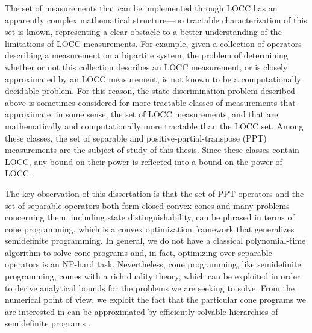 The set of measurements that can be implemented through LOCC has an apparently
complex mathematical structure---no tractable characterization of this set is
known, representing a clear obstacle to a better understanding of the
limitations of LOCC measurements.
For example, given a collection of operators 
describing a measurement on a bipartite system, the problem of determining whether or
not this collection describes an LOCC measurement, or is closely approximated
by an LOCC measurement, is not known to be a computationally decidable
problem.
For this reason, the state discrimination problem described above is sometimes
considered for more tractable classes of measurements that approximate, in some
sense, the set of LOCC measurements, and that are mathematically and computationally 
more tractable than the LOCC set.
Among these classes, the set of separable and positive-partial-transpose (PPT) measurements 
are the subject of study of this thesis.
Since these classes contain LOCC, any bound on their power is reflected into a 
bound on the power of LOCC.

The key observation of this dissertation is that the set of PPT operators
and the set of separable operators both form closed convex cones and many problems concerning them, 
including state distinguishability, can be phrased in terms of cone programming,
which is a convex optimization framework that generalizes semidefinite programming.
In general, we do not have a classical polynomial-time algorithm to solve
cone programs and, in fact, optimizing over separable operators is an NP-hard task. 
Nevertheless, cone programming, like semidefinite programming, comes with a rich duality theory,
which can be exploited in order to derive analytical bounds for the problems we are seeking to solve.
From the numerical point of view, we exploit the fact that the particular cone programs
we are interested in can be approximated by efficiently solvable hierarchies of 
semidefinite programs \cite{Doherty02}.

